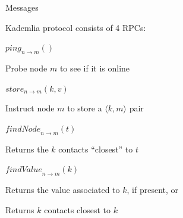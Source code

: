 \begin{frame}{Messages}
	
Kademlia protocol consists of 4 RPCs:
\BIL
\item \alert{$\mathit{ping}_{n \rightarrow m}()$}
	\BI
	\item Probe node $m$ to see if it is online
	\EI
\item \alert{$\mathit{store}_{n \rightarrow m}(k, v)$}
	\BI
	\item Instruct node $m$ to store a $\langle k, m \rangle$ pair
	\EI
\item \alert{$\mathit{findNode}_{n \rightarrow m}(t)$}
	\BI
	\item Returns the $k$ contacts “closest” to $t$
	\EI
\item \alert{$\mathit{findValue}_{n \rightarrow m}(k)$}
	\BI
	\item Returns the value associated to $k$, if present, or 
	\item Returns $k$ contacts closest to $k$
	\EI
\EIL
	
\end{frame}

